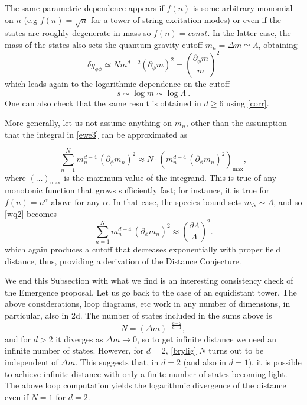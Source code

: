 \documentclass[11pt]{article}
\numberwithin{equation}{section}
\numberwithin{equation}{section}
\theoremstyle{remark}
\begin{document}
The same parametric dependence appears if $f(n)$ is some arbitrary monomial on $n$ (e.g $f(n)=\sqrt{n}$ for a tower of string excitation modes) or even if the states are roughly degenerate in mass so $f(n)=const$. In the latter case, the mass of the states also sets the quantum gravity cutoff $m_n=\Delta m\simeq \Lambda$, obtaining
\begin{equation} 
\delta g_{\phi\phi}\simeq  N m^{d-2} (\partial_\phi m)^2 =\left(\frac{\partial_\phi  m}{ m}\right)^2
\end{equation}
which leads again to the logarithmic dependence on the cutoff
\begin{equation} 
s\sim\log m\sim \log \Lambda \ .
\end{equation}
One can also check that the same result is obtained in $d\geq 6$ using \eqref{corr}.

More generally, let us not assume anything on $m_n$, other than the assumption that the integral in \eqref{ewe3} can be approximated as 

\begin{equation} \sum^N_{n=1} m_n^{d-4}\, (\partial_\phi m_n)^2 \approx N \cdot \left(m_n^{d-4}\, (\partial_\phi m_n)^2\right)_{\text{max}},\label{wq2}\end{equation}
where $(\ldots)_{\text{max}}$ is the maximum value of the integrand. This is true of any monotonic function that grows sufficiently fast; for instance, it is true for $f(n)=n^\alpha$ above for any $\alpha$. In that case, the species bound sets $m_N\sim \Lambda$, and so \eqref{wq2} becomes
\begin{equation} \sum^N_{n=1} m_n^{d-4}\, (\partial_\phi m_n)^2 \approx \left(\frac{\partial \Lambda}{\Lambda}\right)^2.\label{wq3}\end{equation}
which again produces a cutoff that decreases exponentially with proper field distance, thus, providing a derivation of the Distance Conjecture.

We end this Subsection with what we find is an interesting consistency check of the Emergence proposal. Let us go back to the case of an equidistant tower. 
The above considerations, loop diagrams, etc work in any number of dimensions, in particular, also in 2d. The number of states included in the sums above is
\begin{equation} N=(\Delta m)^{-\frac{d-2}{d-1}},\label{brylig}\end{equation}
and for $d>2$ it diverges as $\Delta m\rightarrow0$, so to get infinite distance we need an infinite number of states. However, for $d=2$, \eqref{brylig} $N$ turns out to be independent of $\Delta m$. This suggests that, in $d=2$ (and also in $d=1$), it is possible to achieve infinite distance with only a finite number of states becoming light. The above loop computation yields the logarithmic divergence of the distance even if $N=1$ for $d=2$. 
\end{document}
